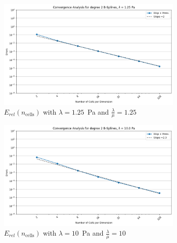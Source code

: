 \documentclass[a4paper,12pt,twoside]{report}
\begin{document}
\begin{figure}[!h]
	\centering
	\begin{subfigure}[b]{0.49\textwidth}
		\centering
		\includegraphics[width=\textwidth]{figures/figures_mixed_DH/sum_convergence_plot_degree_2_lambda=1.25.png}
		\caption{$E_{rel}(n_{\text{cells}})$ with $\lambda = 1.25$~Pa and $\frac{\lambda}{\mu} = 1.25$}
		\label{fig:convergencedegree2mixeddirichlethomogeneouslambda1.25}
	\end{subfigure}
	\begin{subfigure}[b]{0.49\textwidth}
		\centering
		\includegraphics[width=\textwidth]{figures/figures_mixed_DH/sum_convergence_plot_degree_2_lambda=10.0.png}
		\caption{$E_{rel}(n_{\text{cells}})$ with $\lambda = 10$~Pa and $\frac{\lambda}{\mu} = 10$}
		\label{fig:convergencedegree2mixeddirichlethomogeneouslambda10}
	\end{subfigure}
	\begin{subfigure}[b]{0.49\textwidth}
		\centering

\end{subfigure}
\end{figure}
\end{document}
